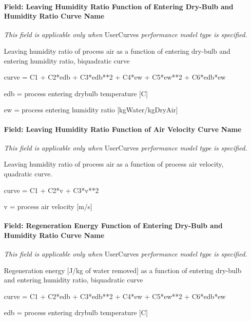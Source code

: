 \paragraph{Field: Leaving Humidity Ratio Function of Entering Dry-Bulb and Humidity Ratio Curve Name}\label{field-leaving-humidity-ratio-function-of-entering-dry-bulb-and-humidity-ratio-curve-name}

\emph{This field is applicable only when} UserCurves \emph{performance model type is specified.}

Leaving humidity ratio of process air as a function of entering dry-bulb and entering humidity ratio, biquadratic curve

curve = C1 + C2*edb + C3*edb**2 + C4*ew + C5*ew**2 + C6*edb*ew

edb = process entering drybulb temperature {[}C{]}

ew = process entering humidity ratio {[}kgWater/kgDryAir{]}

\paragraph{Field: Leaving Humidity Ratio Function of Air Velocity Curve Name}\label{field-leaving-humidity-ratio-function-of-air-velocity-curve-name}

\emph{This field is applicable only when} UserCurves \emph{performance model type is specified.}

Leaving humidity ratio of process air as a function of process air velocity, quadratic curve.

curve = C1 + C2*v + C3*v**2

v = process air velocity {[}m/s{]}

\paragraph{Field: Regeneration Energy Function of Entering Dry-Bulb and Humidity Ratio Curve Name}\label{field-regeneration-energy-function-of-entering-dry-bulb-and-humidity-ratio-curve-name}

\emph{This field is applicable only when} UserCurves \emph{performance model type is specified.}

Regeneration energy {[}J/kg of water removed{]} as a function of entering dry-bulb and entering humidity ratio, biquadratic curve

curve = C1 + C2*edb + C3*edb**2 + C4*ew + C5*ew**2 + C6*edb*ew

edb = process entering drybulb temperature {[}C{]}

